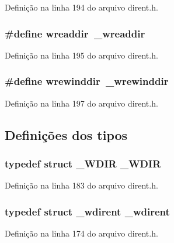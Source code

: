 Definição na linha 194 do arquivo dirent.\+h.

\subsubsection[{wreaddir}]{\setlength{\rightskip}{0pt plus 5cm}\#define wreaddir~\+\_\+wreaddir}\label{dirent_8h_a53e09ee78c993b9feebaf49cb47146f1}


Definição na linha 195 do arquivo dirent.\+h.

\subsubsection[{wrewinddir}]{\setlength{\rightskip}{0pt plus 5cm}\#define wrewinddir~\+\_\+wrewinddir}\label{dirent_8h_a8de41b9888772577edbb17b85dce573e}


Definição na linha 197 do arquivo dirent.\+h.



\subsection{Definições dos tipos}
\subsubsection[{\+\_\+\+W\+D\+IR}]{\setlength{\rightskip}{0pt plus 5cm}typedef struct {\bf \+\_\+\+W\+D\+IR} {\bf \+\_\+\+W\+D\+IR}}\label{dirent_8h_a29ac3d7a7c3ecfd3db9de331f5b71279}


Definição na linha 183 do arquivo dirent.\+h.

\subsubsection[{\+\_\+wdirent}]{\setlength{\rightskip}{0pt plus 5cm}typedef struct {\bf \+\_\+wdirent} {\bf \+\_\+wdirent}}\label{dirent_8h_a7083dcfe4c262f51d7b4e065df46ebc5}


Definição na linha 174 do arquivo dirent.\+h.

